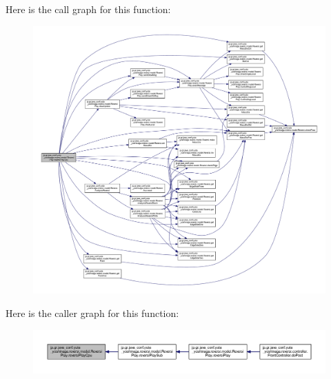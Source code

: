 Here is the call graph for this function\+:
\nopagebreak
\begin{figure}[H]
\begin{center}
\leavevmode
\includegraphics[width=350pt]{classjp_1_1gr_1_1java__conf_1_1yuta__yoshinaga_1_1reversi_1_1model_1_1_reversi_play_a1b1b5c91163c374bc2e0bf23ff922617_cgraph}
\end{center}
\end{figure}
Here is the caller graph for this function\+:
\nopagebreak
\begin{figure}[H]
\begin{center}
\leavevmode
\includegraphics[width=350pt]{classjp_1_1gr_1_1java__conf_1_1yuta__yoshinaga_1_1reversi_1_1model_1_1_reversi_play_a1b1b5c91163c374bc2e0bf23ff922617_icgraph}
\end{center}
\end{figure}
\mbox{\label{classjp_1_1gr_1_1java__conf_1_1yuta__yoshinaga_1_1reversi_1_1model_1_1_reversi_play_abd208c350d3713ef6872faaa813ac8c3}} 

